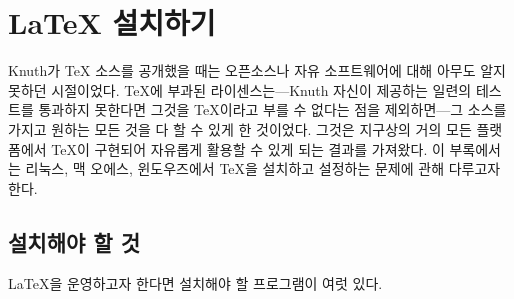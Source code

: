 \appendix

\firmlists

\chapter{\LaTeX{} 설치하기}
\label{appx:installation}
\begin{intro}
Knuth가 \TeX{} 소스를 공개했을 때는 오픈소스나 자유 소프트웨어에 대해 아무도 알지 못하던 시절이었다.
\TeX{}에 부과된 라이센스는---Knuth 자신이 제공하는 일련의 테스트를 통과하지 못한다면 
그것을 \TeX{}이라고 부를 수 없다는 점을 제외하면---그 소스를 가지고 원하는 모든 것을 다 할 수 있게 한 것이었다.
그것은 지구상의 거의 모든 플랫폼에서 \TeX{}이 구현되어 자유롭게 활용할 수 있게 되는 결과를 가져왔다.
이 부록에서는 리눅스, 맥 오에스, 윈도우즈에서 \TeX{}을 설치하고 설정하는 문제에 관해 다루고자 한다.
\end{intro}


\section{설치해야 할 것}

\LaTeX 을 운영하고자 한다면 설치해야 할 프로그램이 여럿 있다.

